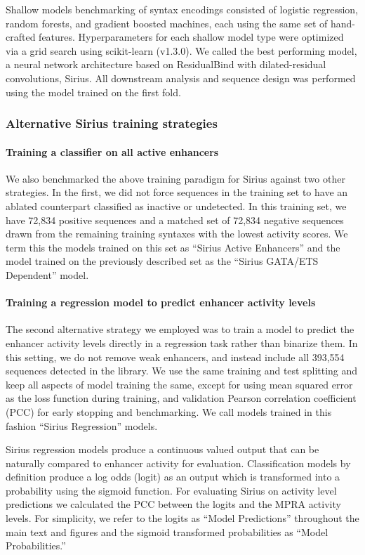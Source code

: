 Shallow models benchmarking of syntax encodings consisted of logistic regression, random forests, and gradient boosted machines, each using the same set of hand-crafted features. Hyperparameters for each shallow model type were optimized via a grid search using scikit-learn (v1.3.0). We called the best performing model, a neural network architecture based on ResidualBind\cite{Koo2021-ly} with dilated-residual convolutions, Sirius. All downstream analysis and sequence design was performed using the model trained on the first fold.

\subsubsection{Alternative Sirius training strategies}

\paragraph{Training a classifier on all active enhancers}
We also benchmarked the above training paradigm for Sirius against two other strategies. In the first, we did not force sequences in the training set to have an ablated counterpart classified as inactive or undetected. In this training set, we have 72,834 positive sequences and a matched set of 72,834 negative sequences drawn from the remaining training syntaxes with the lowest activity scores. We term this the models trained on this set as “Sirius Active Enhancers” and the model trained on the previously described set as the “Sirius GATA/ETS Dependent” model.

\paragraph{Training a regression model to predict enhancer activity levels}
The second alternative strategy we employed was to train a model to predict the enhancer activity levels directly in a regression task rather than binarize them. In this setting, we do not remove weak enhancers, and instead include all 393,554 sequences detected in the library. We use the same training and test splitting and keep all aspects of model training the same, except for using mean squared error as the loss function during training, and validation Pearson correlation coefficient (PCC) for early stopping and benchmarking. We call models trained in this fashion “Sirius Regression” models. 

Sirius regression models produce a continuous valued output that can be naturally compared to enhancer activity for evaluation. Classification models by definition produce a log odds (logit) as an output which is transformed into a probability using the sigmoid function. For evaluating Sirius on activity level predictions we calculated the PCC between the logits and the MPRA activity levels. For simplicity, we refer to the logits as “Model Predictions” throughout the main text and figures and the sigmoid transformed probabilities as “Model Probabilities.”

